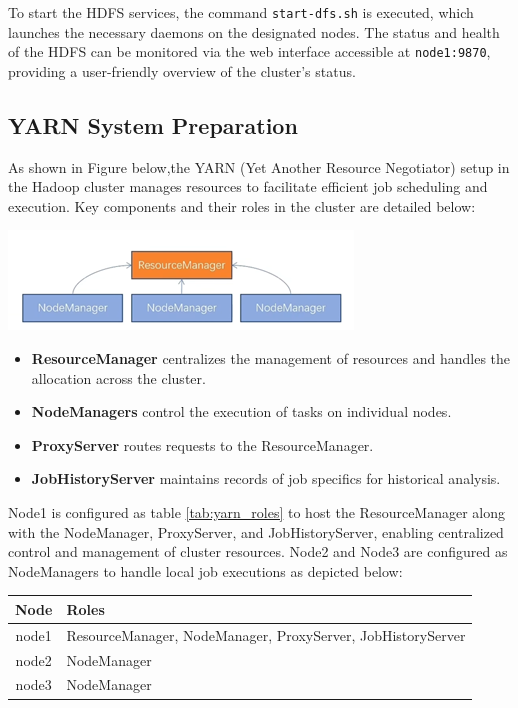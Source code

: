 \documentclass[12pt,a4paper]{article}
\begin{document}
\begin{multicols}{2}
To start the HDFS services, the command \texttt{start-dfs.sh} is executed, which launches the necessary daemons on the designated nodes. The status and health of the HDFS can be monitored via the web interface accessible at \texttt{node1:9870}, providing a user-friendly overview of the cluster's status.

\subsection{YARN System Preparation}
As shown in Figure below,the YARN (Yet Another Resource Negotiator) setup in the Hadoop cluster manages resources to facilitate efficient job scheduling and execution. Key components and their roles in the cluster are detailed below:

    \includegraphics[width=\linewidth]{YARN_architecture.jpg}
    \label{fig:yarn_architecture}



\begin{itemize}
    \item \textbf{ResourceManager} centralizes the management of resources and handles the allocation across the cluster.
    \item \textbf{NodeManagers} control the execution of tasks on individual nodes.
    \item \textbf{ProxyServer} routes requests to the ResourceManager.
    \item \textbf{JobHistoryServer} maintains records of job specifics for historical analysis.
\end{itemize}

Node1 is configured as table \ref{tab:yarn_roles} to host the ResourceManager along with the NodeManager, ProxyServer, and JobHistoryServer, enabling centralized control and management of cluster resources. Node2 and Node3 are configured as NodeManagers to handle local job executions as depicted below:

\begin{center}
    \begin{tabularx}{\columnwidth}{|c|X|}
    \hline
    Node & Roles \\
    \hline
    node1 & ResourceManager, NodeManager,
            ProxyServer, JobHistoryServer \\
    node2 & NodeManager \\
    node3 & NodeManager \\
    \hline
    \end{tabularx}
    \label{tab:yarn_roles}
\end{center}


\end{multicols}
\end{document}
